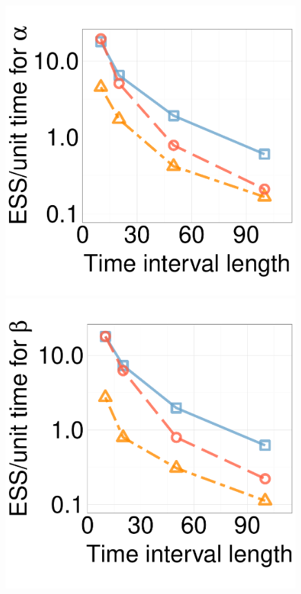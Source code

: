 \begin{figure}[H]
\begin{minipage}[hp]{0.24\linewidth}
  \end{minipage}
  \begin{minipage}[hp]{0.24\linewidth}
  \centering
    \includegraphics [width=0.99\textwidth, angle=0]{figs/new_experiment_figs/ESS_vs_t_alpha.pdf}
      \end{minipage}
  \begin{minipage}[hp]{0.24\linewidth}
  \centering
    \includegraphics [width=0.99\textwidth, angle=0]{figs/new_experiment_figs/ESS_vs_t_beta.pdf}

\end{minipage}
\end{figure}
